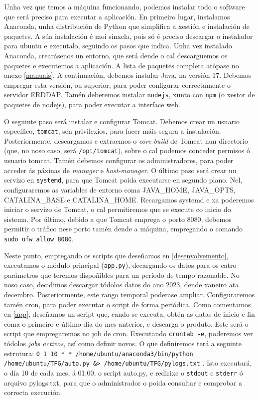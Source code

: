 Unha vez que temos a máquina funcionando, podemos instalar todo o software que será preciso para executar a aplicación. En primeiro lugar, instalamos Anaconda, unha distribución de Python que
simplifica a xestión e instalación de paquetes. A súa instalación é moi sinxela, pois só é preciso descargar o instalador para ubuntu e executalo, seguindo os pasos que indica. Unha vez instalado
Anaconda, crearásenos un entorno, que será dende o cal descarguemos os paquetes e executemos a aplicación. A lista de paquetes completa atópase no anexo \ref{manuais}. A continuación, debemos
instalar Java, na versión 17. Debemos empregar esta versión, ou superior, para poder configurar correctamente o servidor ERDDAP. Tamén deberemos instalar \texttt{nodejs}, xunto con \texttt{npm} (o
xestor de paquetes de nodejs), para poder executar a interface web.

O seguinte paso será instalar e configurar Tomcat. Debemos crear un usuario específico, \texttt{tomcat}, sen privilexios, para facer máis segura a instalación. Posteriormente, descargamos e
extraemos o \textit{core build} de Tomcat nun directorio (que, no noso caso, será \texttt{/opt/tomcat}), sobre o cal podemos conceder permisos ó usuario tomcat. Tamén debemos configurar os
administradores, para poder acceder ás páxinas de \textit{manager} e \textit{host-manager}. O último paso será crear un servizo en \texttt{systemd}, para que Tomcat poida executarse en segundo plano.
Nel, configuraremos as variables de entorno coma JAVA\_HOME, JAVA\_OPTS, CATALINA\_BASE e CATALINA\_HOME. Recargamos systemd e xa poderemos iniciar o servizo de Tomcat, o cal permitiremos que se
execute co inicio do sistema. Por último, debido a que Tomcat emprega o porto 8080, debemos permitir o tráfico nese porto tamén dende a máquina, empregando o comando \texttt{sudo ufw allow 8080}.

Neste punto, empregando os scripts que deseñamos en \ref{desenvolvemento}, executamos o módulo principal (\texttt{app.py}), decargando os datos para os catro parámetros que teremos dispoñibles para
un período de tempo razonable. No noso caso, decidimos descargar tódolos datos do ano 2023, dende xaneiro ata decembro. Posteriormente, este rango temporal poderase ampliar. Configuraremos tamén
cron, para poder executar o script de forma periódica. Como comentamos en \ref{app}, deseñamos un script que, cando se executa, obtén as datas de inicio e fin coma o primeiro e último día do mes
anterior, e descarga o produto. Este será o script que empregaremos no job de cron. Executando \texttt{crontab -e}, poderemos ver tódolos \textit{jobs activos}, así como definir novos. O que
definiremos terá a seguinte estrutura: \texttt{0 1 10 * * /home/ubuntu/anaconda3/bin/python /home/ubuntu/TFG/auto.py \break \&> /home/ubuntu/TFG/pylogs.txt} . Isto executará, o día 10 de cada mes,
á 01:00, o script auto.py, e redirixe o \texttt{stdout} e \texttt{stderr} ó arquivo pylogs.txt, para que o administrador o poida consultar e comprobar a correcta execución.


